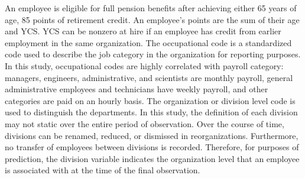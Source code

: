 \documentclass[12pt,letterpaper]{article}
\begin{document}
 An employee is eligible for full pension benefits after achieving either 65 years of age, 85 points of retirement credit. An employee's points are the sum of their age and YCS.  YCS can be nonzero at hire if an employee has credit from earlier employment in the same organization. %
 The occupational code is a standardized code used to describe the job category in the organization for reporting purposes. In this study, occupational codes are highly correlated with payroll category: managers, engineers, administrative, and scientists are monthly payroll, general administrative employees and technicians have weekly payroll, and other categories are paid on an hourly basis. The organization or division level code is used to distinguish the departments.  In this study, the definition of each division may not static over the entire period of observation.  Over the course of time, divisions can be renamed, reduced, or dismissed in reorganizations. Furthermore, no transfer of employees between divisions is recorded.  Therefore, for purposes of prediction, the division variable indicates the organization level that an employee is associated with at the time of the final observation.
\end{document}
